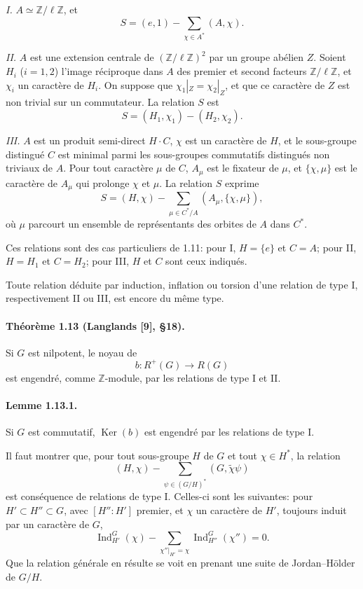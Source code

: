 \documentclass[10pt]{article}
\newcommand{\Z}{\mathbb Z}
\newcommand{\Ind}{\operatorname{Ind}}
\providecommand{\Ker}{\operatorname{Ker}}
\begin{document}
\emph{I.} \(A\simeq\Z/\ell\Z\), et
\[
S=(e,1)-\sum_{\chi\in A^*}(A,\chi).
\]

\emph{II.} \(A\) est une extension centrale de \((\Z/\ell\Z)^2\) par un groupe abélien \(Z\). Soient \(H_i\) (\(i=1,2\)) l'image réciproque dans \(A\) des premier et second facteurs \(\Z/\ell\Z\), et \(\chi_i\) un caractère de \(H_i\). On suppose que \(\chi_1|_Z=\chi_2|_Z\), et que ce caractère de \(Z\) est non trivial sur un commutateur. La relation \(S\) est
\[
S=(H_1,\chi_1)-(H_2,\chi_2).
\]

\emph{III.} \(A\) est un produit semi-direct \(H\cdot C\), \(\chi\) est un caractère de \(H\), et le sous-groupe distingué \(C\) est minimal parmi les sous-groupes commutatifs distingués non triviaux de \(A\). Pour tout caractère \(\mu\) de \(C\), \(A_\mu\) est le fixateur de \(\mu\), et \(\{\chi,\mu\}\) est le caractère de \(A_\mu\) qui prolonge \(\chi\) et \(\mu\). La relation \(S\) exprime
\[
S=(H,\chi)-
\sum_{\mu\in C^*/A}
(A_\mu,\{\chi,\mu\}),
\]
où \(\mu\) parcourt un ensemble de représentants des orbites de \(A\) dans \(C^*\).

Ces relations sont des cas particuliers de 1.11: pour I, \(H=\{e\}\) et \(C=A\); pour II, \(H=H_1\) et \(C=H_2\); pour III, \(H\) et \(C\) sont ceux indiqués.

Toute relation déduite par induction, inflation ou torsion d'une relation de type I, respectivement II ou III, est encore du même type.

\paragraph{Théorème 1.13 (Langlands [9], §18).} Si \(G\) est nilpotent, le noyau de
\[
b:R^+(G)\longrightarrow R(G)
\]
est engendré, comme \(\Z\)-module, par les relations de type I et II.

\paragraph{Lemme 1.13.1.} Si \(G\) est commutatif, \(\Ker(b)\) est engendré par les relations de type I.

Il faut montrer que, pour tout sous-groupe \(H\) de \(G\) et tout \(\chi\in H^*\), la relation
\[
(H,\chi)-\sum_{\psi\in (G/H)^*}(G,\tilde\chi\psi)
\]
est conséquence de relations de type I. Celles-ci sont les suivantes: pour \(H'\subset H''\subset G\), avec \([H'':H']\) premier, et \(\chi\) un caractère de \(H'\), toujours induit par un caractère de \(G\),
\[
\Ind_{H'}^G(\chi)-\sum_{\chi''|_{H'}=\chi}\Ind_{H''}^G(\chi'')=0.
\]
Que la relation générale en résulte se voit en prenant une suite de Jordan--Hölder de \(G/H\).
\end{document}
